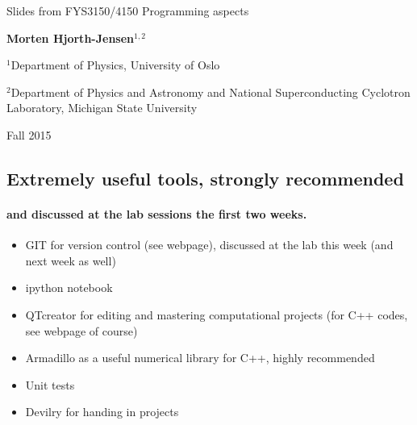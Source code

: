 \documentclass[%
oneside,                 %
final,                   %
10pt]{article}
\begin{document}






\thispagestyle{empty}

\begin{center}
{\LARGE\bf
\begin{spacing}{1.25}
Slides from FYS3150/4150 Programming aspects
\end{spacing}
}
\end{center}


\begin{center}
{\bf Morten Hjorth-Jensen${}^{1, 2}$} \\ [0mm]
\end{center}

\begin{center}
\centerline{{\small ${}^1$Department of Physics, University of Oslo}}
\centerline{{\small ${}^2$Department of Physics and Astronomy and National Superconducting Cyclotron Laboratory, Michigan State University}}
\end{center}
    

\begin{center} %
Fall 2015
\end{center}

\vspace{1cm}


\subsection{Extremely useful tools, strongly recommended}


\paragraph{and discussed at the lab sessions the first two weeks.}
\begin{itemize}
  \item GIT for version control (see webpage), discussed at the lab this week (and next week as well)

  \item ipython notebook 

  \item QTcreator for editing and mastering computational projects (for C++ codes, see webpage of course)

  \item Armadillo as a useful numerical library for C++, highly recommended

  \item Unit tests

  \item Devilry for handing in projects
\end{itemize}
\end{document}
